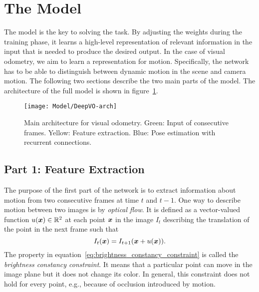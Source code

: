 	
	\section{The Model}
		The model is the key to solving the task.
		By adjusting the weights during the training phase, it learns a high-level representation of relevant information in the input that is needed to produce the desired output.
		In the case of visual odometry, we aim to learn a representation for motion.
		Specifically, the network has to be able to distinguish between dynamic motion in the scene and camera motion.
		The following two sections describe the two main parts of the model.
		The architecture of the full model is shown in figure~\ref{fig:main-architecture}.
		\begin{figure}[t]
			\centering
			\texttt{[image: Model/DeepVO-arch]}
			\caption[Main architecture for visual odometry]
					{Main architecture for visual odometry.
					 Green: Input of consecutive frames.
					 Yellow: Feature extraction.
					 Blue: Pose estimation with recurrent connections.
					 \label{fig:main-architecture}}
		\end{figure}
		
		\subsection{Part 1: Feature Extraction}
			The purpose of the first part of the network is to extract information about motion from two consecutive frames at time $t$ and $t - 1$.
			One way to describe motion between two images is by \emph{optical flow}.
			It is defined as a vector-valued function $u(\bm{x}) \in \mathbb{R}^2$ at each point $\bm{x}$ in the image $I_{t}$ describing the translation of the point in the next frame such that
			\begin{equation}\label{eq:brightness_constancy_constraint}
				I_{t}(\bm{x}) = I_{t + 1}(\bm{x} + u(\bm{x})).
			\end{equation}
			The property in equation~\ref{eq:brightness_constancy_constraint} is called the \emph{brightness constancy constraint}. 
			It means that a particular point can move in the image plane but it does not change its color.
			In general, this constraint does not hold for every point, e.g., because of occlusion introduced by motion.
			
